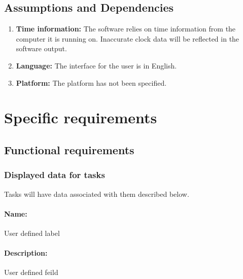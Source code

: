 \documentclass[12pt,a4paper]{article}
\begin{document}

\subsection{Assumptions and Dependencies}
\begin{enumerate}
\item \textbf{Time information:} The software relies on time information from the computer it is running on. Inaccurate clock data will be reflected in the software output. 
\item \textbf{Language:} The interface for the user is in English.
\item \textbf{Platform:} The platform has not been specified.
\end{enumerate}

\section{Specific requirements}

\subsection{Functional requirements}

\subsubsection{Displayed data for tasks}
Tasks will have data associated with them described below. 
\paragraph{Name:} User defined label
\paragraph{Description:} User defined feild
\end{document}
